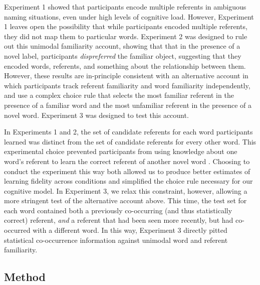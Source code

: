 \documentclass[authoryear,review]{elsarticle}
\begin{document}
Experiment 1 showed that participants encode multiple referents in ambiguous naming situations, even under high levels of cognitive load. However, Experiment 1 leaves open the possibility that while participants encoded multiple referents, they did not map them to particular words. Experiment 2 was designed to rule out this unimodal familiarity account, showing that that in the presence of a novel label, participants \emph{dispreferred} the familiar object, suggesting that they encoded words, referents, and something about the relationship between them. However, these results are in-principle consistent with an alternative account in which participants track referent familiarity and word familiarity independently, and use a complex choice rule that selects the most familiar referent in the presence of a familiar word and the most unfamiliar referent in the presence of a novel word. Experiment 3 was designed to test this account.

In Experiments 1 and 2, the set of candidate referents for each word participants learned was distinct from the set of candidate referents for every other word. This experimental choice prevented participants from using knowledge about one word's referent to learn the correct referent of another novel word \cite[c.f.][]{Smith2011a,Yurovsky2013}. Choosing to conduct the experiment this way both allowed us to produce better estimates of learning fidelity across conditions and simplified the choice rule necessary for our cognitive model. In Experiment 3, we relax this constraint, however, allowing a more stringent test of the alternative account above. This time, the test set for each word contained both a previously co-occurring (and thus statistically correct) referent, \emph{and} a referent that had been seen more recently, but had co-occurred with a different word. In this way, Experiment 3 directly pitted statistical co-occurrence information against unimodal word and referent familiarity.

\subsection{Method}
\end{document}
